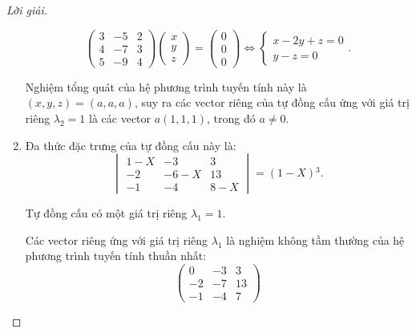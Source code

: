 \documentclass[class=linearalgebra,crop=false]{standalone}
\begin{document}
\begin{proof}[Lời giải]
\begin{enumerate}[label = (\alph*)]
\[\begin{pmatrix}
                      3 & -5 & 2 \\
                      4 & -7 & 3 \\
                      5 & -9 & 4
                  \end{pmatrix}
                  \begin{pmatrix}
                      x \\
                      y \\
                      z
                  \end{pmatrix}
                  =
                  \begin{pmatrix}
                      0 \\
                      0 \\
                      0
                  \end{pmatrix}
                  \Longleftrightarrow
                  \begin{cases}
                      x - 2y + z = 0 \\
                      y - z = 0
                  \end{cases}.
              \]
              \par Nghiệm tổng quát của hệ phương trình tuyến tính này là $(x, y, z) = (a, a, a)$, suy ra các vector riêng của tự đồng cấu ứng với giá trị riêng $\lambda_{2} = 1$ là các vector $a(1, 1, 1)$, trong đó $a \ne 0$.
        \item Đa thức đặc trưng của tự đồng cấu này là:
              \[
                  \begin{vmatrix}
                      1 - X & -3     & 3     \\
                      -2    & -6 - X & 13    \\
                      -1    & -4     & 8 - X
                  \end{vmatrix}
                  = (1-X){}^{3}.
              \]
              \par Tự đồng cấu có một giá trị riêng $\lambda_{1} = 1$.
              \par Các vector riêng ứng với giá trị riêng $\lambda_{1}$ là nghiệm không tầm thường của hệ phương trình tuyến tính thuần nhất:
              \[
                  \begin{pmatrix}
                      0  & -3 & 3  \\
                      -2 & -7 & 13 \\
                      -1 & -4 & 7
                  \end{pmatrix}
\]
\end{enumerate}
\end{proof}
\end{document}

